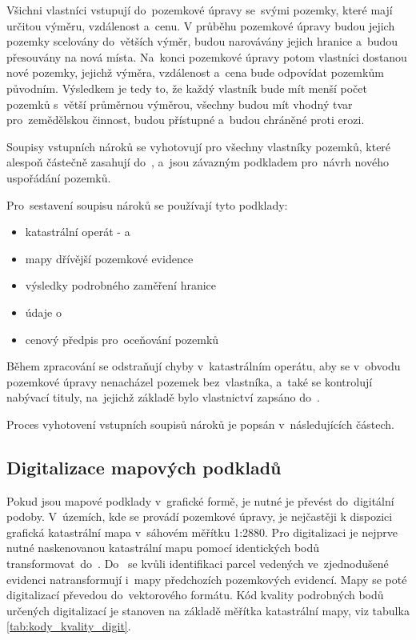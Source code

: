 Všichni vlastníci vstupují do~pozemkové úpravy se~svými pozemky, které mají určitou výměru, vzdálenost a~cenu. V průběhu pozemkové úpravy budou jejich pozemky scelovány do~větších výměr, budou narovávány jejich hranice a~budou přesouvány na nová místa. Na~konci pozemkové úpravy potom vlastníci dostanou nové pozemky, jejichž výměra, vzdálenost a~cena bude odpovídat pozemkům původním. Výsledkem je tedy to, že každý vlastník bude mít menší počet pozemků s~větší průměrnou výměrou, všechny budou mít vhodný tvar pro~zemědělskou činnost, budou přístupné a~budou chráněné proti erozi.

Soupisy vstupních nároků se vyhotovují pro všechny vlastníky pozemků, které alespoň částečně zasahují do~, a~jsou závazným podkladem pro~návrh nového uspořádání pozemků.

Pro~sestavení soupisu nároků se používají tyto podklady:
	\begin{itemize}[leftmargin=1.5cm, noitemsep]
		\item katastrální operát -  a~
		\item mapy dřívější pozemkové evidence
		\item výsledky podrobného zaměření hranice 
		\item údaje o~
		\item cenový předpis pro~oceňování pozemků
	\end{itemize}

Během zpracování  se odstraňují chyby v~katastrálním operátu, aby se v~obvodu pozemkové úpravy nenacházel pozemek bez~vlastníka, a~také se kontrolují nabývací tituly, na~jejichž základě bylo vlastnictví zapsáno do~.

Proces vyhotovení vstupních soupisů nároků je popsán v~následujících částech.

\subsection{Digitalizace mapových podkladů}
\label{digitalizace}

Pokud jsou mapové podklady v~grafické formě, je nutné je převést do~digitální podoby. V~územích, kde se provádí pozemkové úpravy, je nejčastěji k dispozici grafická katastrální mapa v~sáhovém měřítku 1:2880. Pro digitalizaci je nejprve nutné naskenovanou katastrální mapu pomocí identických bodů transformovat\ do~. Do~ se kvůli identifikaci parcel vedených ve~zjednodušené evidenci natransformují i~mapy předchozích pozemkových evidencí. Mapy se poté digitalizací převedou do~vektorového formátu. Kód kvality podrobných bodů určených digitalizací je stanoven na základě měřítka katastrální mapy, viz tabulka \ref{tab:kody_kvality_digit}.

